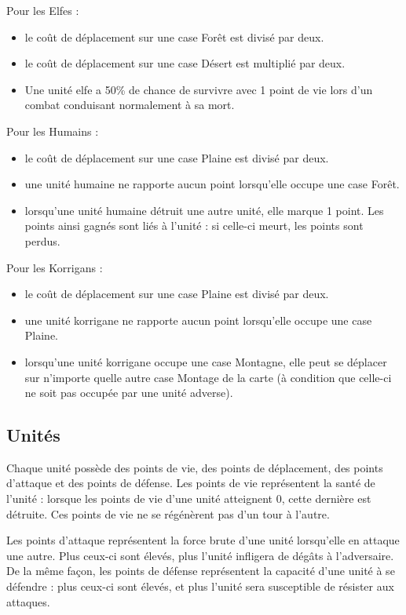		Pour les Elfes :
		\begin{itemize}
			\item le coût de déplacement sur une case Forêt est divisé par deux. 
			\item le coût de déplacement sur une case Désert est multiplié par deux.
			\item Une unité elfe a 50\% de chance de survivre avec 1 point de vie lors d’un combat conduisant normalement à sa mort.
		\end{itemize}
		
		Pour les Humains :
		\begin{itemize}
			\item le coût de déplacement sur une case Plaine est divisé par deux.
			\item une unité humaine ne rapporte aucun point lorsqu'elle occupe une case Forêt.
			\item lorsqu’une unité humaine détruit une autre unité, elle marque 1 point. Les points ainsi gagnés sont liés à l'unité : si celle-ci meurt, les points sont perdus.
		\end{itemize}
		
		Pour les Korrigans :
		\begin{itemize}
			\item le coût de déplacement sur une case Plaine est divisé par deux.
			\item une unité korrigane ne rapporte aucun point lorsqu'elle occupe une case Plaine.
			\item lorsqu'une unité korrigane occupe une case Montagne, elle peut se déplacer sur n’importe quelle autre case Montage de la carte (à condition que celle-ci ne soit pas occupée par une unité adverse).
		\end{itemize}

	\subsection{Unités}
	Chaque unité possède des points de vie, des points de déplacement, des points d'attaque et des points de défense. Les points de vie représentent la santé de l'unité : lorsque les points de vie d'une unité atteignent 0, cette dernière est détruite. Ces points de vie ne se régénèrent pas d'un tour à l'autre.
	
	Les points d'attaque représentent la force brute d'une unité lorsqu'elle en attaque une autre.  Plus ceux-ci sont élevés, plus l'unité infligera de dégâts à l'adversaire. De la même façon, les points de défense représentent la capacité d'une unité à se défendre : plus ceux-ci sont élevés, et plus l'unité sera susceptible de résister aux attaques. 
	
